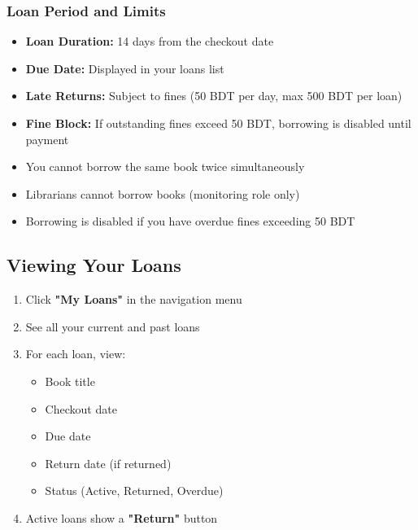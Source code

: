 \documentclass[12pt,a4paper]{article}
\begin{document}
\subsubsection{Loan Period and Limits}
\begin{itemize}[leftmargin=*]
    \item \textbf{Loan Duration:} 14 days from the checkout date
    \item \textbf{Due Date:} Displayed in your loans list
    \item \textbf{Late Returns:} Subject to fines (50 BDT per day, max 500 BDT per loan)
    \item \textbf{Fine Block:} If outstanding fines exceed 50 BDT, borrowing is disabled until payment
\end{itemize}

\begin{tcolorbox}[colback=red!5!white,colframe=red,title=Borrowing Restrictions]
\begin{itemize}[leftmargin=*]
    \item You cannot borrow the same book twice simultaneously
    \item Librarians cannot borrow books (monitoring role only)
    \item Borrowing is disabled if you have overdue fines exceeding 50 BDT
\end{itemize}
\end{tcolorbox}

\subsection{Viewing Your Loans}
\begin{enumerate}[leftmargin=*]
    \item Click \textbf{"My Loans"} in the navigation menu
    \item See all your current and past loans
    \item For each loan, view:
        \begin{itemize}
            \item Book title
            \item Checkout date
            \item Due date
            \item Return date (if returned)
            \item Status (Active, Returned, Overdue)
        \end{itemize}
    \item Active loans show a \textbf{"Return"} button
\end{enumerate}
\end{document}
